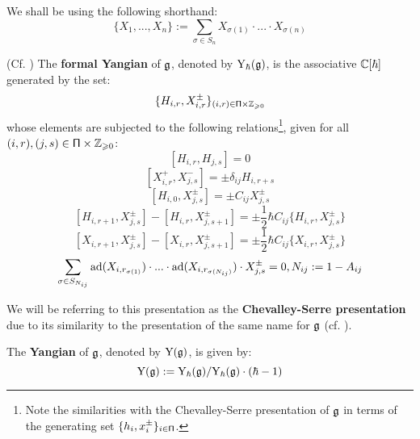         \begin{convention}
            We shall be using the following shorthand:
                $$\{ X_1, ..., X_n \} := \sum_{\sigma \in S_n} X_{\sigma(1)} \cdot ... \cdot X_{\sigma(n)}$$
        \end{convention}
        \begin{definition} \label{def: formal_finite_type_yangians}
            (Cf. \cite[Definition 2.1]{guay_nakajima_wendlandt_affine_yangian_coproduct}) The \textbf{formal Yangian} of $\mathfrak{g}$, denoted by $\mathrm{Y}_{\hbar}(\mathfrak{g})$, is the associative $\mathbb{C}[\hbar]$ generated by the set:
                $$\{ H_{i, r}, X_{i, r}^{\pm} \}_{(i, r) \in \simpleroots \x \Z_{\geq 0}}$$
            whose elements are subjected to the following relations\footnote{Note the similarities with the Chevalley-Serre presentation of $\mathfrak{g}$ in terms of the generating set $\{ h_i, x_i^{\pm} \}_{i \in \mathsf{\Pi}}$.}, given for all $(i, r), (j, s) \in \simpleroots \x \Z_{\geq 0}$:
                $$[ H_{i, r}, H_{j, s} ] = 0$$
                $$[ X_{i, r}^+, X_{j, s}^- ] = \pm \delta_{ij} H_{i, r + s}$$
                $$[ H_{i, 0}, X_{j, s}^{\pm} ] = \pm C_{ij} X_{j, s}^{\pm}$$
                $$[ H_{i, r + 1}, X_{j, s}^{\pm} ] - [ H_{i, r}, X_{j, s + 1}^{\pm} ] = \pm \frac12 \hbar C_{ij} \{H_{i, r}, X_{j, s}^{\pm}\}$$
                $$[ X_{i, r + 1}, X_{j, s}^{\pm} ] - [ X_{i, r}, X_{j, s + 1}^{\pm} ] = \pm \frac12 \hbar C_{ij} \{X_{i, r}, X_{j, s}^{\pm}\}$$
                $$\sum_{\sigma \in S_{N_{ij}}} \mathrm{ad}(X_{i, r_{\sigma(1)}}) \cdot ... \cdot \mathrm{ad}(X_{i, r_{\sigma(N_{ij})}}) \cdot X_{j, s}^{\pm} = 0, N_{ij} := 1 - A_{ij}$$
                
            We will be referring to this presentation as the \textbf{Chevalley-Serre presentation} due to its similarity to the presentation of the same name for $\mathfrak{g}$ (cf. \cite[Section 8]{humphreys_lie_algebras}). 
        \end{definition}
        \begin{definition}[Yangians] \label{def: finite_type_yangians}
            The \textbf{Yangian} of $\mathfrak{g}$, denoted by $\mathrm{Y}(\mathfrak{g})$, is given by:
                $$\mathrm{Y}(\mathfrak{g}) := \mathrm{Y}_{\hbar}(\mathfrak{g})/\mathrm{Y}_{\hbar}(\mathfrak{g}) \cdot (\hbar - 1)$$
        \end{definition}
